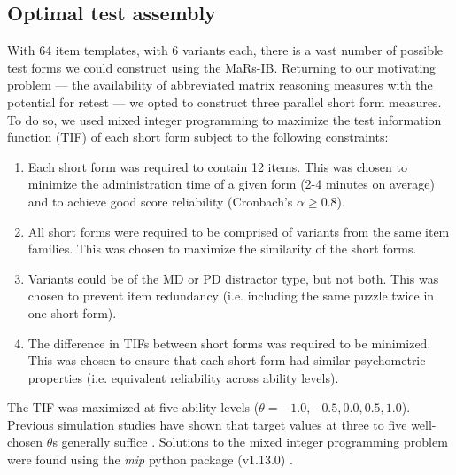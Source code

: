 \documentclass[a4paper,man,natbib]{apa6}
\begin{document}
\subsection{Optimal test assembly}

With 64 item templates, with 6 variants each, there is a vast number of possible test forms we could construct using the MaRs-IB. Returning to our motivating problem --- the availability of abbreviated matrix reasoning measures with the potential for retest --- we opted to construct three parallel short form measures. To do so, we used mixed integer programming \citep{der2005wj} to maximize the test information function (TIF) of each short form subject to the following constraints:

\begin{enumerate}

    \item Each short form was required to contain 12 items. This was chosen to minimize the administration time of a given form (2-4 minutes on average) and to achieve good score reliability (Cronbach's $\alpha \geq 0.8$).
    
    \item All short forms were required to be comprised of variants from the same item families. This was chosen to maximize the similarity of the short forms.
    
    \item Variants could be of the MD or PD distractor type, but not both. This was chosen to prevent item redundancy (i.e. including the same puzzle twice in one short form).
    
    \item The difference in TIFs between short forms was required to be minimized. This was chosen to ensure that each short form had similar psychometric properties (i.e. equivalent reliability across ability levels). 
    
\end{enumerate}

\noindent The TIF was maximized at five ability levels ($\theta = -1.0, -0.5, 0.0, 0.5, 1.0$). Previous simulation studies have shown that target values at three to five well-chosen $\theta$s generally suffice \citep{der2005wj}. Solutions to the mixed integer programming problem were found using the \textit{mip} python package (v1.13.0) \citep{santos2020mixed}.
\end{document}
